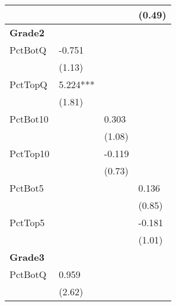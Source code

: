\begin{table}[htb]
\begin{threeparttable}
\begin{tabular}{l l l l}
               &                               &                               & (0.49)                       \\
      \hline
      \textbf{Grade2}   &                               &                               &                              \\
      PctBotQ  & -0.751                        &                               &                              \\
               & (1.13)                        &                               &                              \\
      PctTopQ  & 5.224***                      &                               &                              \\
               & (1.81)                        &                               &                              \\
      PctBot10 &                               & 0.303                         &                              \\
               &                               & (1.08)                        &                              \\
      PctTop10 &                               & -0.119                        &                              \\
               &                               & (0.73)                        &                              \\
      PctBot5  &                               &                               & 0.136                        \\
               &                               &                               & (0.85)                       \\
      PctTop5  &                               &                               & -0.181                       \\
               &                               &                               & (1.01)                       \\
      \hline
      \textbf{Grade3}   &                               &                               &                              \\
      PctBotQ  & 0.959                         &                               &                              \\
               & (2.62)                        &                               &                              \\

\end{tabular}
\end{threeparttable}
\end{table}
